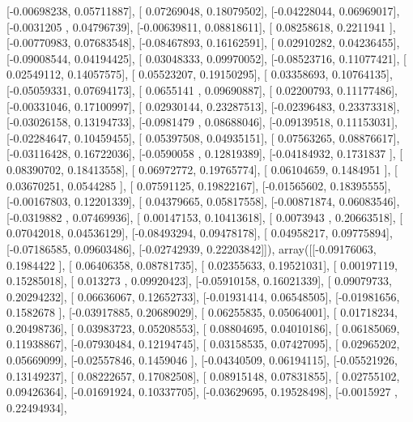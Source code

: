 \documentclass{article}
\begin{document}
       [-0.00698238,  0.05711887],
       [ 0.07269048,  0.18079502],
       [-0.04228044,  0.06969017],
       [-0.0031205 ,  0.04796739],
       [-0.00639811,  0.08818611],
       [ 0.08258618,  0.2211941 ],
       [-0.00770983,  0.07683548],
       [-0.08467893,  0.16162591],
       [ 0.02910282,  0.04236455],
       [-0.09008544,  0.04194425],
       [ 0.03048333,  0.09970052],
       [-0.08523716,  0.11077421],
       [ 0.02549112,  0.14057575],
       [ 0.05523207,  0.19150295],
       [ 0.03358693,  0.10764135],
       [-0.05059331,  0.07694173],
       [ 0.0655141 ,  0.09690887],
       [ 0.02200793,  0.11177486],
       [-0.00331046,  0.17100997],
       [ 0.02930144,  0.23287513],
       [-0.02396483,  0.23373318],
       [-0.03026158,  0.13194733],
       [-0.0981479 ,  0.08688046],
       [-0.09139518,  0.11153031],
       [-0.02284647,  0.10459455],
       [ 0.05397508,  0.04935151],
       [ 0.07563265,  0.08876617],
       [-0.03116428,  0.16722036],
       [-0.0590058 ,  0.12819389],
       [-0.04184932,  0.1731837 ],
       [ 0.08390702,  0.18413558],
       [ 0.06972772,  0.19765774],
       [ 0.06104659,  0.1484951 ],
       [ 0.03670251,  0.0544285 ],
       [ 0.07591125,  0.19822167],
       [-0.01565602,  0.18395555],
       [-0.00167803,  0.12201339],
       [ 0.04379665,  0.05817558],
       [-0.00871874,  0.06083546],
       [-0.0319882 ,  0.07469936],
       [ 0.00147153,  0.10413618],
       [ 0.0073943 ,  0.20663518],
       [ 0.07042018,  0.04536129],
       [-0.08493294,  0.09478178],
       [ 0.04958217,  0.09775894],
       [-0.07186585,  0.09603486],
       [-0.02742939,  0.22203842]]), array([[-0.09176063,  0.1984422 ],
       [ 0.06406358,  0.08781735],
       [ 0.02355633,  0.19521031],
       [ 0.00197119,  0.15285018],
       [ 0.013273  ,  0.09920423],
       [-0.05910158,  0.16021339],
       [ 0.09079733,  0.20294232],
       [ 0.06636067,  0.12652733],
       [-0.01931414,  0.06548505],
       [-0.01981656,  0.1582678 ],
       [-0.03917885,  0.20689029],
       [ 0.06255835,  0.05064001],
       [ 0.01718234,  0.20498736],
       [ 0.03983723,  0.05208553],
       [ 0.08804695,  0.04010186],
       [ 0.06185069,  0.11938867],
       [-0.07930484,  0.12194745],
       [ 0.03158535,  0.07427095],
       [ 0.02965202,  0.05669099],
       [-0.02557846,  0.1459046 ],
       [-0.04340509,  0.06194115],
       [-0.05521926,  0.13149237],
       [ 0.08222657,  0.17082508],
       [ 0.08915148,  0.07831855],
       [ 0.02755102,  0.09426364],
       [-0.01691924,  0.10337705],
       [-0.03629695,  0.19528498],
       [-0.0015927 ,  0.22494934],
\end{document}
